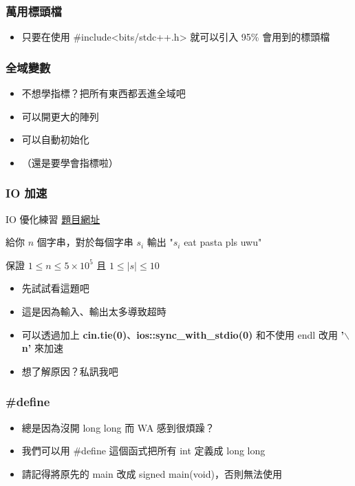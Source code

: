 \documentclass[mathserif]{beamer}
\begin{document}
\begin{frame}
    \frametitle{萬用標頭檔}
    \begin{itemize}
        \item 只要在使用 \#include<bits/stdc++.h> 就可以引入 95\% 會用到的標頭檔
    \end{itemize}
\end{frame}

\begin{frame}
    \frametitle{全域變數}
    \begin{itemize}
        \item 不想學指標？把所有東西都丟進全域吧
        \item 可以開更大的陣列
        \item 可以自動初始化
        \item （還是要學會指標啦）
    \end{itemize}
\end{frame}

\begin{frame}
    \frametitle{IO 加速}
    \begin{block}{IO 優化練習}
        \href{https://codeforces.com/group/S6XjkGb6qB/contest/403070/problem/A}{題目網址}

        給你 $n$ 個字串，對於每個字串 $s_i$ 輸出 "$s_i$ eat pasta pls uwu"

        保證 $1 \leq n \leq 5 \times 10^5$ 且 $1 \leq \mid s \mid \leq 10$
    \end{block}
    \begin{itemize}
        \item {先試試看這題吧}
        \item<2-> 這是因為輸入、輸出太多導致超時
        \item<2-> 可以透過加上 \textbf{cin.tie(0)}、\textbf{ios::sync\_with\_stdio(0)} 和不使用 endl 改用 \textbf{'$\backslash$ n'} 來加速
        \item<3-> 想了解原因？私訊我吧
    \end{itemize}
\end{frame}

\begin{frame}
    \frametitle{\#define}
    \begin{itemize}
        \item 總是因為沒開 long long 而 WA 感到很煩躁？
        \item<2-> 我們可以用 \#define 這個函式把所有 int 定義成 long long
        \item<3-> 請記得將原先的 main 改成 signed main(void)，否則無法使用
    \end{itemize}
\end{frame}
\end{document}
